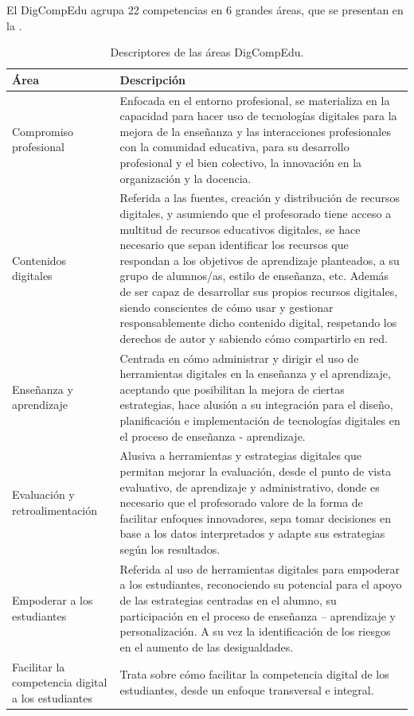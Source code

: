 \documentclass[spanish]{textolivre}
\begin{document}
El DigCompEdu agrupa 22 competencias en 6 grandes áreas, que se presentan en la  \cite{christine_redecker_european_2017}.

\begin{table}[htbp]
    \centering
    \begin{threeparttable}
    \caption{Descriptores de las áreas DigCompEdu.}
    \label{tab02}
    \begin{tabular}{p{}p{}}
    \toprule
    Área & Descripción \\
    \midrule
    Compromiso profesional & 
    Enfocada en el entorno profesional, se materializa en la capacidad para hacer uso de tecnologías digitales para la mejora de la enseñanza y las interacciones profesionales con la comunidad educativa, para su desarrollo profesional y el bien colectivo, la innovación en la organización y la docencia. \\
    Contenidos digitales & 
    Referida a las fuentes, creación y distribución de recursos digitales, y asumiendo que el profesorado tiene acceso a multitud de recursos educativos digitales, se hace necesario que sepan identificar los recursos que respondan a los objetivos de aprendizaje planteados, a su grupo de alumnos/as, estilo de enseñanza, etc. Además de ser capaz de desarrollar sus propios recursos digitales, siendo conscientes de cómo usar y gestionar responsablemente dicho contenido digital, respetando los derechos de autor y sabiendo cómo compartirlo en red. \\
    Enseñanza y aprendizaje & 
    Centrada en cómo administrar y dirigir el uso de herramientas digitales en la enseñanza y el aprendizaje, aceptando que posibilitan la mejora de ciertas estrategias, hace alusión a su integración para el diseño, planificación e implementación de tecnologías digitales en el proceso de enseñanza - aprendizaje. \\
    Evaluación y retroalimentación &
    Alusiva a herramientas y estrategias digitales que permitan mejorar la evaluación, desde el punto de vista evaluativo, de aprendizaje y administrativo, donde es necesario que el profesorado valore de la forma de facilitar enfoques innovadores, sepa tomar decisiones en base a los datos interpretados y adapte sus estrategias según los resultados. \\
    Empoderar a los estudiantes & 
    Referida al uso de herramientas digitales para empoderar a los estudiantes, reconociendo su potencial para el apoyo de las estrategias centradas en el alumno, su participación en el proceso de enseñanza – aprendizaje y personalización. A su vez la identificación de los riesgos en el aumento de las desigualdades. \\
    Facilitar la competencia digital a los estudiantes &
    Trata sobre cómo facilitar la competencia digital de los estudiantes, desde un enfoque transversal e integral. \\
    \bottomrule
    \end{tabular}
    \end{threeparttable}
\end{table}
\end{document}

